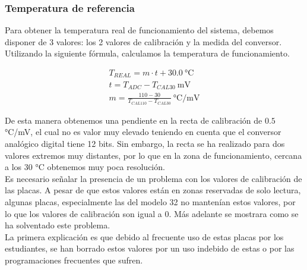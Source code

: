 \documentclass[spanish]{template/minim}
\begin{document}
\subsubsection{Temperatura de referencia}
Para obtener la temperatura real de funcionamiento del sistema, debemos disponer de 3 valores: los 2 valores de calibración y la medida del conversor. Utilizando la siguiente fórmula, calculamos la temperatura de funcionamiento.\\

\begin{figure}[H]
    \centering

        \begin{align*}
          T_{REAL} = m \cdot t + 30.0~\si{\celsius}\\[.8em]
          t = T_{ADC} - T_{CAL 30}~\si{\milli\volt}\\[.8em]
          m = \frac{110 - 30}{T_{CAL 110} - T_{CAL 30}}~\si{\celsius\per\milli\volt}
        \end{align*}

\end{figure}

De esta manera obtenemos una pendiente en la recta de calibración de $0.5$ \si{\celsius}/mV, el cual no es valor muy elevado teniendo en cuenta que el conversor analógico digital tiene 12 bits. Sin embargo, la recta se ha realizado para dos valores extremos muy distantes, por lo que en la zona de funcionamiento, cercana a los 30 \si{\celsius} obtenemos muy poca resolución.\\

Es necesario señalar la presencia de un problema con los valores de calibración de las placas. A pesar de que estos valores están en zonas reservadas de solo lectura, algunas placas, especialmente las del modelo 32 no mantenían estos valores, por lo que los valores de calibración son igual a 0. Más adelante se mostrara como se ha solventado este problema.\\

La primera explicación es que debido al frecuente uso de estas placas por los estudiantes, se han borrado estos valores por un uso indebido de estas o por las programaciones frecuentes que sufren.\\
\end{document}
